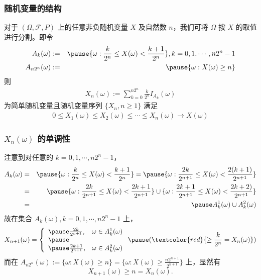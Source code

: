 \begin{frame}
	\frametitle{随机变量的结构}
	对于 $(\Omega,\mathcal{F},P)$ 上的任意非负随机变量 $X$ 及自然数 $n$，我们可将 $\Omega$ 按 $X$ 的取值进行分割。即令
	\begin{eqnarray*}
		A_k(\omega)&:=&\pause \{\omega:\frac{k}{2^n}\le X(\omega)<\frac{k+1}{2^n}\}, k=0,1,\cdots, n2^n-1\\
		A_{n2^n}(\omega)&:=&\pause \{\omega:X(\omega)\ge n\}
	\end{eqnarray*}
	\pause 则
	\begin{eqnarray*}
		X_n(\omega):=\sum_{k=0}^{n2^n}\frac{k}{2^n}I_{A_k}(\omega)
	\end{eqnarray*}
	为简单随机变量且随机变量序列 $\{X_n,n\ge 1\}$ 满足
	\begin{eqnarray*}
		0\le X_1(\omega)\le X_2(\omega)\le \cdots\le X_n(\omega)\rightarrow X(\omega)
	\end{eqnarray*}
\end{frame}
\begin{frame}
	\frametitle{$X_n (\omega)$ 的单调性}
	注意到对任意的 $k=0,1,\cdots,n2^n-1$，
	\begin{eqnarray*}
		A_k(\omega)&=&\pause \{\omega:\frac{k}{2^n}\le X(\omega)<\frac{k+1}{2^n}\}=\pause \{\omega:\frac{2k}{2^{n+1}}\le X(\omega)<\frac{2(k+1)}{2^{n+1}}\}\\
		&=&\pause \{\omega:\frac{2k}{2^{n+1}}\le X(\omega)<\frac{2k+1}{2^{n+1}}\}\cup \{\omega:\frac{2k+1}{2^{n+1}}\le X(\omega)<\frac{2k+2)}{2^{n+1}}\}\\
		&=&\pause A_k^1(\omega)\cup A_k^2(\omega)
	\end{eqnarray*}
	\pause 故在集合 $A_k (\omega),k=0,1,\cdots,n2^n-1$ 上，\pause
	\begin{eqnarray*}
		X_{n+1}(\omega)=
		\left\{\begin{array}{ll}
			\pause  \frac{2k}{2^{n+1}},   & \omega\in A_k^1(\omega)  \\ \pause
			                              &                          \\
			\pause  \frac{2k+1}{2^{n+1}}, & \omega\in A_k^2(\omega)
		\end{array}
		\right.\pause  (\textcolor{red}{\ge \frac{k}{2^n}=X_n(\omega)})
	\end{eqnarray*}
	\pause
	而在 $A_{n2^n}(\omega):=\{\omega:X (\omega)\ge n\}=\{\omega:X (\omega)\ge \frac{n2^{n+1}}{2^{n+1}}\}$ 上，显然有
	\pause $$X_{n+1}(\omega)\ge n=X_n(\omega).$$
\end{frame}

